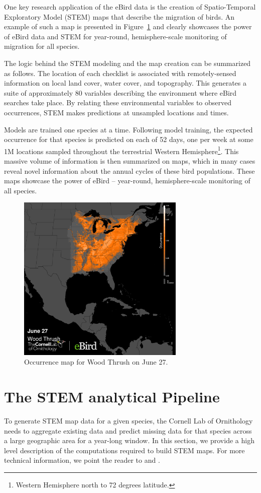 \documentclass{acm_proc_article-sp}
\begin{document}
One key research application of the eBird data is the creation of Spatio-Temporal Exploratory Model (STEM) maps that describe the migration of birds. An example of such a map is presented in Figure~\ref{fig::stem} and clearly showcases the power of eBird data and STEM for year-round, hemisphere-scale monitoring of migration for all species.

The logic behind the STEM modeling and the map creation can be summarized as follows. The location of each checklist is associated with remotely-sensed information on local land cover, water cover, and topography. This generates a suite of approximately 80 variables describing the environment where eBird searches take place. By relating these environmental variables to observed occurrences, STEM makes predictions at unsampled locations and times. 

Models are trained one species at a time. Following model training, the expected occurrence for that species is predicted on each of 52 days, one per week at some 1M locations sampled throughout the terrestrial Western Hemisphere\footnote{Western Hemisphere north to 72 degrees latitude.}. This massive volume of information is then summarized on maps, which in many cases reveal novel information about the annual cycles of these bird populations. These maps showcase the power of eBird -- year-round, hemisphere-scale monitoring of all species.

\begin{figure}[h]
    \centering
    \includegraphics[width=8cm]{IMG/stem.png}
    \caption{Occurrence map for Wood Thrush on June 27.}
    \label{fig::stem}
\end{figure}

\section{The STEM analytical Pipeline}\label{sec::pipeline}
To generate STEM map data for a given species, the Cornell Lab of Ornithology needs to aggregate existing data and predict missing data for that species across a large geographic area for a year-long window. In this section, we provide a high level description of the computations required to build STEM maps. For more technical information, we point the reader to \cite{Fink2010-fb} and \cite{Johnston2015-pf}.
\end{document}
